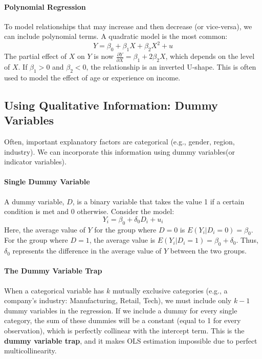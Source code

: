 \documentclass{article}
\begin{document}
\paragraph{Polynomial Regression}
To model relationships that may increase and then decrease (or vice-versa), we can include polynomial terms. A quadratic model is the most common:
\begin{equation}
    Y = \beta_0 + \beta_1 X + \beta_2 X^2 + u
\end{equation}
The partial effect of $X$ on $Y$ is now $\frac{\partial Y}{\partial X} = \beta_1 + 2\beta_2 X$, which depends on the level of $X$. If $\beta_1 > 0$ and $\beta_2 < 0$, the relationship is an inverted U-shape. This is often used to model the effect of age or experience on income.

\subsection{Using Qualitative Information: Dummy Variables}
\label{sub:dummy_variables}

Often, important explanatory factors are categorical (e.g., gender, region, industry). We can incorporate this information using dummy variables(or indicator variables).

\paragraph{Single Dummy Variable}
A dummy variable, $D$, is a binary variable that takes the value 1 if a certain condition is met and 0 otherwise. Consider the model:
\begin{equation}
    Y_i = \beta_0 + \delta_0 D_i + u_i
\end{equation}
Here, the average value of $Y$ for the group where $D=0$ is $E(Y_i|D_i=0) = \beta_0$. For the group where $D=1$, the average value is $E(Y_i|D_i=1) = \beta_0 + \delta_0$. Thus, $\delta_0$ represents the difference in the average value of $Y$ between the two groups.

\paragraph{The Dummy Variable Trap}
When a categorical variable has $k$ mutually exclusive categories (e.g., a company's industry: Manufacturing, Retail, Tech), we must include only $k-1$ dummy variables in the regression. If we include a dummy for every single category, the sum of these dummies will be a constant (equal to 1 for every observation), which is perfectly collinear with the intercept term. This is the \textbf{dummy variable trap}, and it makes OLS estimation impossible due to perfect multicollinearity. 
\end{document}
